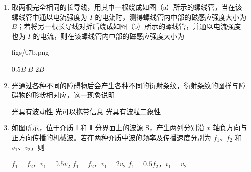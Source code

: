 \documentclass[\gkver]{gaokaozhenti}
\begin{document}
\begin{enumerate}
\item
取两根完全相同的长导线，用其中一根绕成如图（a）所示的螺线管，当在该螺线管中通以电流强度为 $I$ 的电流时，测得螺线管内中部的磁感应强度大小为 $B$；若将另一根长导线对折后绕成如图（b）所示的螺线管，并通以电流强度也为 $I$ 的电流，则在该螺线管内中部的磁感应强度大小为

{figs/07b.png}

{$0.5B$}
{$B$}
{$2B$}


\item
光通过各种不同的障碍物后会产生各种不同的衍射条纹，衍射条纹的图样与障碍物的形状相对应，这一现象说明

{光具有波动性}
{光可以携带信息}
{光具有波粒二象性}


\item
如图所示，位于介质 Ⅰ 和 Ⅱ 分界面上的波源 S，产生两列分别沿 $x$ 轴负方向与正方向传播的机械波。若在两种介质中波的频率及传播速度分别为 $f_{1}$、$f_{2}$ 和 $v_{1}$、$v_{2}$，则

\onepicture[w=6.77cm]{}

{$f_{1}=f_{2}$，$v_{1}=0.5v_{2}$}
{$f_{1}=f_{2}$，$v_{1}=2v_{2}$}
{$f_{1}=0.5f_{2}$，$v_{1}=v_{2}$}



\end{enumerate}
\end{document}

